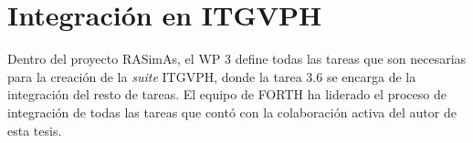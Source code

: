 \section{Integración en  ITGVPH}
\label{rasim:herramienta}


Dentro del proyecto \ac{RASimAs}, el \acs{WP} 3 define todas las tareas que son necesarias para la creación de la \emph{suite} \ac{ITGVPH}, donde la tarea 3.6 se encarga de la integración
del resto de tareas. El equipo de \ac{FORTH} ha liderado el proceso de integración de todas las tareas que contó con la colaboración activa del autor de esta tesis.








